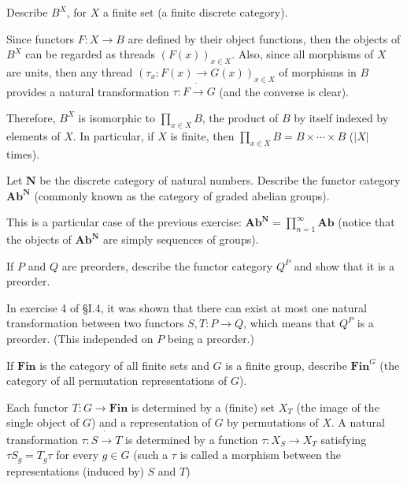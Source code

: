 \begin{exercise}
Describe $B^X$, for $X$ a finite set (a finite discrete category).
\end{exercise}
\begin{solution}
Since functors $F:X\to B$ are defined by their object functions, then the objects of $B^X$ can be regarded as threads $(F(x))_{x\in X}$. Also, since all morphisms of $X$ are units, then any thread $(\tau_x:F(x)\to G(x))_{x\in X}$ of morphisms in $B$ provides a natural transformation $\tau:F\dot{\to}G$ (and the converse is clear).

Therefore, $B^X$ is isomorphic to $\prod_{x\in X} B$, the product of $B$ by itself indexed by elements of $X$. In particular, if $X$ is finite, then $\prod_{x\in X} B=B\times\cdots\times B$ ($|X|$ times).
\end{solution}

\begin{exercise}
Let $\mathbf{N}$ be the discrete category of natural numbers. Describe the functor category $\mathbf{Ab}^\mathbf{N}$ (commonly known as the category of graded abelian groups).
\end{exercise}
\begin{solution}
This is a particular case of the previous exercise: $\mathbf{Ab}^\mathbf{N}=\prod_{n=1}^\infty\mathbf{Ab}$ (notice that the objects of $\mathbf{Ab}^\mathbf{N}$ are simply sequences of groups).
\end{solution}

\begin{exercise}
If $P$ and $Q$ are preorders, describe the functor category $Q^P$ and show that it is a preorder.
\end{exercise}
\begin{solution}
In exercise 4 of \S I.4, it was shown that there can exist at most one natural transformation between two functors $S,T:P\to Q$, which means that $Q^P$ is a preorder. (This independed on $P$ being a preorder.)
\end{solution}

\begin{exercise}
If $\mathbf{Fin}$ is the category of all finite sets and $G$ is a finite group, describe $\mathbf{Fin}^G$ (the category of all permutation representations of $G$).
\end{exercise}
\begin{solution}
Each functor $T:G\to\mathbf{Fin}$ is determined by a (finite) set $X_T$ (the image of the single object of $G$) and a representation of $G$ by permutations of $X$. A natural transformation $\tau:S\dot{\to}T$ is determined by a function $\tau:X_S\to X_T$ satisfying $\tau S_g=T_g\tau$ for every $g\in G$ (such a $\tau$ is called a morphism between the representations (induced by) $S$ and $T$)
\end{solution}

